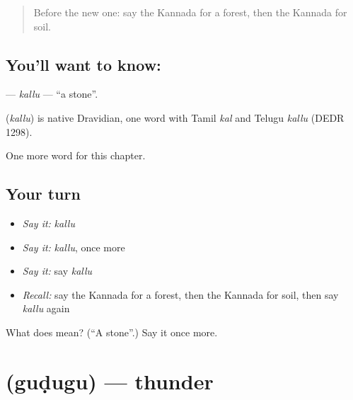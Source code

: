\label{lesson:KA-C127-kallu}



\begin{quote}
Before the new one: say the Kannada for a forest, then the Kannada for soil.
\end{quote}

\subsection*{You'll want to know: }
\textbf{} — \emph{kallu} — \textquotedblleft{}a stone\textquotedblright{}.

\begin{cousinweb}
\textbf{} (\emph{kallu}) is native Dravidian, one word with Tamil \emph{kal} and Telugu \emph{kallu} (DEDR 1298).
\end{cousinweb}

\begin{grammarlens}[title={What you've built}]
One more word for this chapter.
\end{grammarlens}

\subsection*{Your turn}
\begin{itemize}
\raggedright
  \item \emph{Say it:} \emph{kallu}
  \item \emph{Say it:} \emph{kallu}, once more
  \item \emph{Say it:} say \emph{kallu}
  \item \emph{Recall:} say the Kannada for a forest, then the Kannada for soil, then say \emph{kallu} again
\end{itemize}

\begin{tcolorbox}[breakable,colback=teal!4,colframe=teal!35!black,title={Before you move on}]
What does  mean? (\textquotedblleft{}A stone\textquotedblright{}.) Say it once more.
\end{tcolorbox}
\section[\texorpdfstring{\kn{ಗುಡುಗು} (guḍugu)}{ಗುಡುಗು (guḍugu)}]{ (guḍugu) — thunder}

\label{lesson:KA-C127-gudugu}



